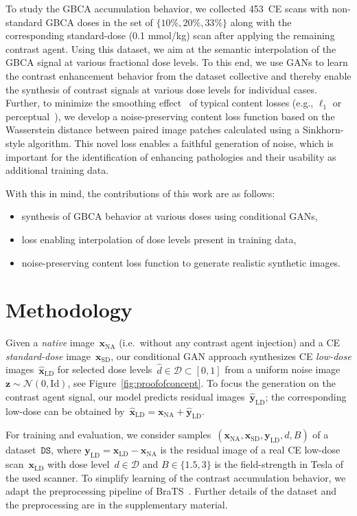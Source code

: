 \documentclass[a4paper,10pt]{article}
\newcommand{\x}{\mathbf{x}}
\newcommand{\y}{\mathbf{y}}
\newcommand{\z}{\mathbf{z}}
\newcommand{\id}{\mathrm{Id}}
\newcommand{\D}{\mathcal{D}}
\newcommand{\DS}{\mathtt{DS}}
\newcommand{\N}{\mathcal{N}}
\newcommand{\NA}{\mathrm{NA}}
\newcommand{\LD}{\mathrm{LD}}
\newcommand{\SD}{\mathrm{SD}}
\begin{document}
To study the GBCA accumulation behavior, we collected 453~CE scans with non-standard GBCA doses in the set of $\{10\%,20\%,33\%\}$ along with the corresponding standard-dose (0.1 mmol/kg) scan after applying the remaining contrast agent.
Using this dataset, we aim at the semantic interpolation of the GBCA signal at various fractional dose levels.
To this end, we use GANs to learn the contrast enhancement behavior from the dataset collective and thereby enable the synthesis of contrast signals at various dose levels for individual cases.
Further, to minimize the smoothing effect~\cite{LaSo16} of typical content losses (e.g., $\ell_1$ or perceptual~\cite{JoAl16}), we develop a noise-preserving content loss function based on the Wasserstein distance between paired image patches calculated using a Sinkhorn-style algorithm.
This novel loss enables a faithful generation of noise, which is important for the identification of enhancing pathologies and their usability as additional training data.

With this in mind, the contributions of this work are as follows:
\begin{itemize}
\item synthesis of GBCA behavior at various doses using conditional GANs,
\item loss enabling interpolation of dose levels present in training data,
\item noise-preserving content loss function to generate realistic synthetic images.
\end{itemize}




\section{Methodology}
Given a \emph{native} image~$\x_\NA$ (i.e.~without any contrast agent injection) and a CE \emph{standard-dose} image~$\x_\SD$, our conditional GAN approach synthesizes CE \emph{low-dose} images~$\hat{\x}_\LD$ for selected dose levels~$\hat{d}\in\D\subset[0,1]$ from a uniform noise image~$\z\sim\N(0,\id)$, see Figure~\ref{fig:proofofconcept}.
To focus the generation on the contrast agent signal, our model predicts residual images~$\hat{\y}_\LD$; the corresponding low-dose can be obtained by~$\hat{\x}_\LD=\x_\NA+\hat{\y}_\LD$.

For training and evaluation, we consider samples~$(\x_\NA,\x_\SD,\y_\LD,d,B)$ of a dataset~$\DS$, where $\y_\LD=\x_\LD-\x_\NA$ is the residual image of a real CE low-dose scan~$\x_\LD$ with dose level~$d\in\D$ and $B\in\{1.5,3\}$ is the field-strength in Tesla of the used scanner.
To simplify learning of the contrast accumulation behavior, we adapt the preprocessing pipeline of BraTS~\cite{BaGh21}.
Further details of the dataset and the preprocessing are in the supplementary material.
\end{document}

